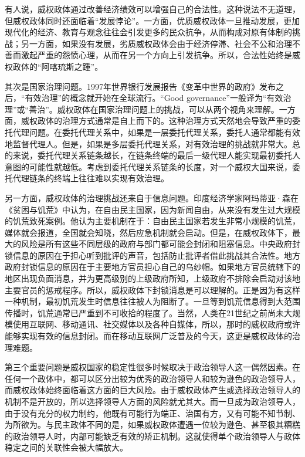 有人说，威权政体通过改善经济绩效可以增强自己的合法性。这种说法不无道理，但威权政体同时还面临着“发展悖论”。一方面，优质威权政体一旦推动发展，更加现代化的经济、教育与观念往往会引发更多的民众抗争，从而构成对原有体制的挑战；另一方面，如果没有发展，劣质威权政体会由于经济停滞、社会不公和治理不善而激起严重的怨愤心理，从而在另一个方向上引发抗争。所以，合法性始终是威权政体的“阿喀琉斯之踵”。

其次是国家治理问题。1997年世界银行发展报告《变革中世界的政府》发布之后，“有效治理”的概念就开始在全球流行。“Good governance”一般译为“有效治理”或“善治”。威权政体在国家治理问题上的挑战，可以从两个视角来理解。一方面，威权政体的治理方式通常是自上而下的。这种治理方式天然地会导致严重的委托代理问题。在委托代理关系中，如果是一层委托代理关系，委托人通常都能有效地监督代理人。但是，如果是多层委托代理关系，对有效治理的挑战就非常大。总的来说，委托代理关系链条越长，在链条终端的最后一级代理人能实现最初委托人意图的可能性就越低。考虑到委托代理关系链条的长度，对一个威权大国来说，委托代理链条的终端上往往难以实现有效治理。

另一方面，威权政体的治理挑战还来自于信息问题。印度经济学家阿玛蒂亚·森在《贫困与饥荒》中认为，在自由民主国家，因为新闻自由，从来没有发生过大规模的饥荒致死案例。他认为主要机制在于：自由民主国家若发生非常小规模的饥荒，媒体就会报道，全国就会知晓，然后应急机制就会启动。但是，在威权政体下，最大的风险是所有这些不同层级的政府与部门都可能会封闭和阻塞信息。中央政府封锁信息的原因在于担心听到批评的声音，包括防止批评者借此挑战其合法性。地方政府封锁信息的原因在于主要地方官员担心自己的乌纱帽。如果地方官员统辖下的地区出现负面消息，并为更高级别的上级政府所知，上级政府不排除会启动对该地主要官员的惩戒程序。所以，威权政体下封锁消息是可以理解的。正是因为有这样一种机制，最初饥荒发生时信息往往被人为阻断了。一旦等到饥荒信息得到大范围传播时，饥荒通常已严重到不可收拾的程度了。当然，人类在21世纪之前尚未大规模使用互联网、移动通讯、社交媒体以及各种自媒体，所以，那时的威权政府或许能够实现有效的信息封闭。而在移动互联网广泛普及的今天，这更是威权政体的治理难题。

第三个重要问题是威权国家的稳定性很多时候取决于政治领导人这一偶然因素。在任何一个政体中，都可以区分出较为优秀的政治领导人和较为逊色的政治领导人，而威权政体始终面临着这方面的巨大风险。由于威权政体产生或选择政治领导人的机制不是开放的，所以选择领导人方面的风险就尤其大。而一旦成为政治领导人，由于没有充分的权力制约，他既有可能行为端正、治国有方，又有可能不知节制、为所欲为。与民主政体不同的是，如果威权政体遭遇一位较为逊色、甚至极其糟糕的政治领导人时，内部可能缺乏有效的矫正机制。这就使得单个政治领导人与政体稳定之间的关联性会被大幅放大。

